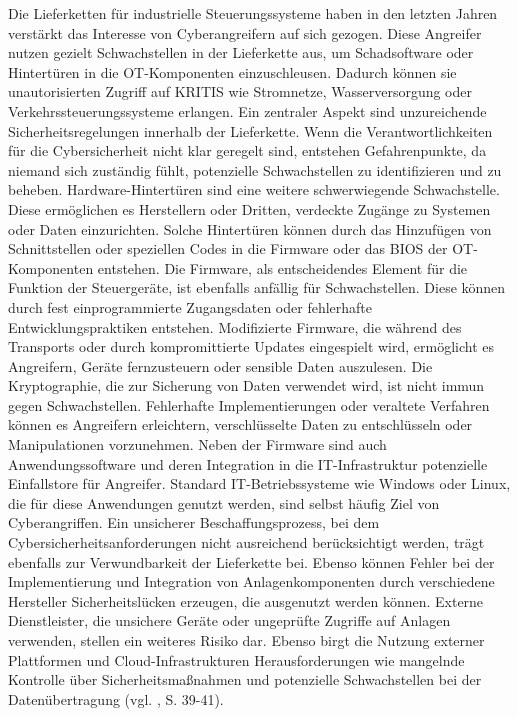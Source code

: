 Die Lieferketten für industrielle Steuerungssysteme haben in den letzten Jahren verstärkt das Interesse von Cyberangreifern auf sich gezogen. Diese Angreifer nutzen gezielt Schwachstellen in der Lieferkette aus, um Schadsoftware oder Hintertüren in die OT-Komponenten einzuschleusen. Dadurch können sie unautorisierten Zugriff auf KRITIS wie Stromnetze, Wasserversorgung oder Verkehrssteuerungssysteme erlangen.
Ein zentraler Aspekt sind unzureichende Sicherheitsregelungen innerhalb der Lieferkette. Wenn die Verantwortlichkeiten für die Cybersicherheit nicht klar geregelt sind, entstehen Gefahrenpunkte, da niemand sich zuständig fühlt, potenzielle Schwachstellen zu identifizieren und zu beheben. Hardware-Hintertüren sind eine weitere schwerwiegende Schwachstelle. Diese ermöglichen es Herstellern oder Dritten, verdeckte Zugänge zu Systemen oder Daten einzurichten. Solche Hintertüren können durch das Hinzufügen von Schnittstellen oder speziellen Codes in die Firmware oder das BIOS der OT-Komponenten entstehen. Die Firmware, als entscheidendes Element für die Funktion der Steuergeräte, ist ebenfalls anfällig für Schwachstellen. Diese können durch fest einprogrammierte Zugangsdaten oder fehlerhafte Entwicklungspraktiken entstehen. Modifizierte Firmware, die während des Transports oder durch kompromittierte Updates eingespielt wird, ermöglicht es Angreifern, Geräte fernzusteuern oder sensible Daten auszulesen. Die Kryptographie, die zur Sicherung von Daten verwendet wird, ist nicht immun gegen Schwachstellen. Fehlerhafte Implementierungen oder veraltete Verfahren können es Angreifern erleichtern, verschlüsselte Daten zu entschlüsseln oder Manipulationen vorzunehmen. Neben der Firmware sind auch Anwendungssoftware und deren Integration in die IT-Infrastruktur potenzielle Einfallstore für Angreifer. Standard IT-Betriebssysteme wie Windows oder Linux, die für diese Anwendungen genutzt werden, sind selbst häufig Ziel von Cyberangriffen. Ein unsicherer Beschaffungsprozess, bei dem Cybersicherheitsanforderungen nicht ausreichend berücksichtigt werden, trägt ebenfalls zur Verwundbarkeit der Lieferkette bei. Ebenso können Fehler bei der Implementierung und Integration von Anlagenkomponenten durch verschiedene Hersteller Sicherheitslücken erzeugen, die ausgenutzt werden können. Externe Dienstleister, die unsichere Geräte oder ungeprüfte Zugriffe auf Anlagen verwenden, stellen ein weiteres Risiko dar. Ebenso birgt die Nutzung externer Plattformen und Cloud-Infrastrukturen Herausforderungen wie mangelnde Kontrolle über Sicherheitsmaßnahmen und potenzielle Schwachstellen bei der Datenübertragung (vgl. \cite{ICS}, S. 39-41).

